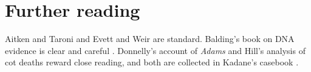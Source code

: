 \section*{Further reading}
Aitken and Taroni \citep{aitken_taroni2004} and Evett and Weir \citep{evett1998} are standard. Balding's book on DNA evidence is clear and careful \citep{balding2005}. Donnelly's account of \emph{Adams} \citep{donnelly2005} and Hill's analysis of cot deaths \citep{hill2004} reward close reading, and both are collected in Kadane's casebook \citep{kadane2008}.
